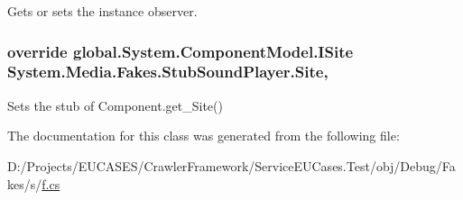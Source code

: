 Gets or sets the instance observer.

\hypertarget{class_system_1_1_media_1_1_fakes_1_1_stub_sound_player_ac984de05778e03112d762263e5cf0135}{
\subsubsection[{Site}]{\setlength{\rightskip}{0pt plus 5cm}override global.\-System.\-Component\-Model.\-I\-Site System.\-Media.\-Fakes.\-Stub\-Sound\-Player.\-Site\hspace{0.3cm}{\ttfamily [get]}, {\ttfamily [set]}}}\label{class_system_1_1_media_1_1_fakes_1_1_stub_sound_player_ac984de05778e03112d762263e5cf0135}


Sets the stub of Component.\-get\-\_\-\-Site()



The documentation for this class was generated from the following file\-:\begin{DoxyCompactItemize}
\item 
D\-:/\-Projects/\-E\-U\-C\-A\-S\-E\-S/\-Crawler\-Framework/\-Service\-E\-U\-Cases.\-Test/obj/\-Debug/\-Fakes/s/\hyperlink{s_2f_8cs}{f.\-cs}\end{DoxyCompactItemize}
